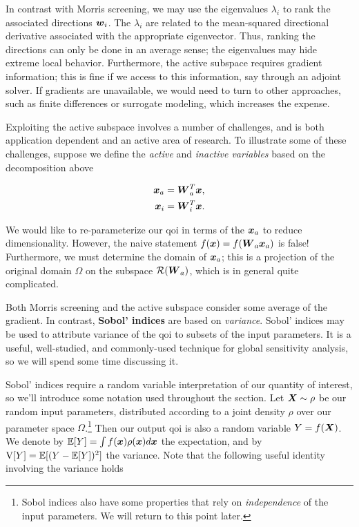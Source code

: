 \documentclass[../primer.tex]{subfiles}
\begin{document}
In contrast with Morris screening, we may use the eigenvalues $\lambda_i$ to
rank the associated directions $\boldsymbol{w}_i$. The $\lambda_i$ are related to the
mean-squared directional derivative associated with the appropriate eigenvector.
Thus, ranking the directions can only be done in an average sense; the
eigenvalues may hide extreme local behavior. Furthermore, the active subspace
requires gradient information; this is fine if we access to this information,
say through an adjoint solver. If gradients are unavailable, we would need to
turn to other approaches, such as finite differences or surrogate modeling,
which increases the expense.

Exploiting the active subspace involves a number of challenges, and is both
application dependent and an active area of research. To illustrate some of
these challenges, suppose we define the \emph{active} and \emph{inactive
  variables} based on the decomposition above

\begin{equation}\begin{aligned}
  \boldsymbol{x}_a &= \boldsymbol{W}^T_a\boldsymbol{x}, \\
  \boldsymbol{x}_i &= \boldsymbol{W}^T_i\boldsymbol{x}.
\end{aligned}\end{equation}

\noindent We would like to re-parameterize our qoi in terms of the $\boldsymbol{x}_a$ to
reduce dimensionality. However, the naive statement $f(\boldsymbol{x})=f(\boldsymbol{W}_a\boldsymbol{x}_a)$ is
false! Furthermore, we must determine the domain of $\boldsymbol{x}_a$; this is a
projection of the original domain $\Omega$ on the subspace $\mathcal{R}(\boldsymbol{W}_a)$, which
is in general quite complicated.

Both Morris screening and the active subspace consider some average of the
gradient. In contrast, \textbf{Sobol' indices} are based on \emph{variance}.
Sobol' indices may be used to attribute variance of the qoi to subsets of the
input parameters. It is a useful, well-studied, and commonly-used technique for
global sensitivity analysis, so we will spend some time discussing it.

Sobol' indices require a random variable interpretation of our quantity of
interest, so we'll introduce some notation used throughout the section. Let
$\boldsymbol{X}\sim\rho$ be our random input parameters, distributed according to a joint
density $\rho$ over our parameter space $\Omega$.\footnote{Sobol indices also
  have some properties that rely on \emph{independence} of the input parameters.
  We will return to this point later.} Then our output qoi is also a random
variable $Y=f(\boldsymbol{X})$. We denote by $\mathbb{E}[Y] = \int f(\boldsymbol{x})\rho(\boldsymbol{x})d\boldsymbol{x}$ the
expectation, and by $\mathrm{V}[Y]=\mathbb{E}[(Y-\mathbb{E}[Y])^2]$ the variance. Note that the
following useful identity involving the variance holds
\end{document}
